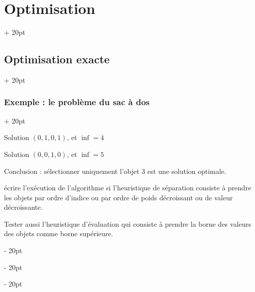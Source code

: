 \documentclass[a4paper, 12pt, twoside]{article}
\newcommand{\floor}[1]{\left\lfloor #1 \right\rfloor}
\newcommand{\ind}[1][20pt]{\advance\leftskip + #1}
\newcommand{\deind}[1][20pt]{\advance\leftskip - #1}
\newenvironment{indt}[2][20pt]{#2 \par \ind[#1]}{\par \deind} %
\newcommand{\1}{\mathbbm 1}
\begin{document}
\begin{indt}{\section{Optimisation}}
\begin{indt}{\subsection{Optimisation exacte}}
\begin{indt}{\subsubsection{Exemple : le problème du sac à dos}}
\begin{center}
                \end{center}

                Solution $(0, 1, 0, 1)$, et $\inf = 4$

                Solution $(0, 0, 1, 0)$, et $\inf = 5$

                \vspace{12pt}
                
                Conclusion : sélectionner uniquement l'objet $3$ est une solution optimale.

                \vspace{6pt}
                
                 écrire l'exécution de l'algorithme si l'heuristique de séparation consiste à prendre les objets par ordre d'indice ou par ordre de poids décroissant ou de valeur décroissante.

                Tester aussi l'heuristique d'évaluation qui consiste à prendre la borne des valeurs des objets comme borne supérieure.
            \end{indt}
        \end{indt}

        \vspace{12pt}
        

\end{indt}
\end{document}
